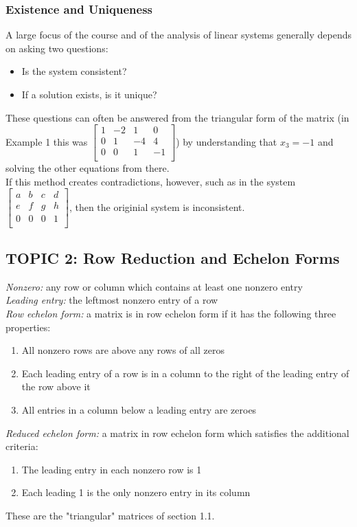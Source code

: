\documentclass[12pt]{article} %
\begin{document}
\subsubsection{Existence and Uniqueness}
A large focus of the course and of the analysis of linear systems generally depends on asking two questions:
\begin{itemize}
	\item Is the system consistent?
	\item If a solution exists, is it unique?
\end{itemize}
These questions can often be answered from the triangular form of the matrix (in Example 1 this was $\begin{bmatrix}1 & -2 & 1 & 0\\ 0 & 1 & -4 & 4\\0 & 0 & 1 & -1\\ \end{bmatrix}$) by understanding that $x_3 = -1$ and solving the other equations from there. \\
If this method creates contradictions, however, such as in the system $\begin{bmatrix}a & b & c & d\\ e & f & g & h\\0 & 0 & 0 & 1\\ \end{bmatrix}$, then the originial system is inconsistent. \\

\subsection{TOPIC 2: Row Reduction and Echelon Forms}
\emph{Nonzero:} any row or column which contains at least one nonzero entry\\

\emph{Leading entry:} the leftmost nonzero entry of a row\\

\emph{Row echelon form:} a matrix is in row echelon form if it has the following three properties:
\begin{enumerate}
	\item All nonzero rows are above any rows of all zeros
	\item Each leading entry of a row is in a column to the right of the leading entry of the row above it
	\item All entries in a column below a leading entry are zeroes
\end{enumerate}
\emph{Reduced echelon form:} a matrix in row echelon form which satisfies the additional criteria:
\begin{enumerate}
\addtocounter{enumi}{3}
\item The leading entry in each nonzero row is 1
\item Each leading 1 is the only nonzero entry in its column
\end{enumerate}
These are the "triangular" matrices of section 1.1.\\
\end{document}
